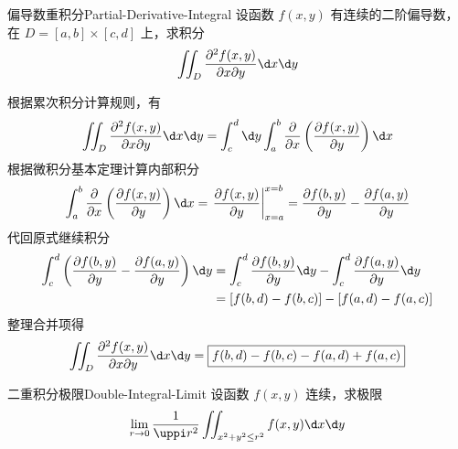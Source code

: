 \begin{problem}{偏导数重积分}{Partial-Derivative-Integral}
    设函数 $f(x, y)$ 有连续的二阶偏导数，在 $D = [a, b] \times [c, d]$ 上，求积分
    \begin{equation}
        \iint_D \frac{\partial^2 f(x, y)}{\partial x \partial y} \d x \d y
    \end{equation}
\end{problem}

\begin{solution}
    根据累次积分计算规则，有
    \begin{equation}
        \iint_D \frac{\partial^2 f(x, y)}{\partial x \partial y} \d x \d y = \int_c^d \d y \int_a^b \frac{\partial}{\partial x} \left( \frac{\partial f(x, y)}{\partial y} \right) \d x
    \end{equation}
    根据微积分基本定理计算内部积分
    \begin{equation}
        \int_a^b \frac{\partial}{\partial x} \left( \frac{\partial f(x, y)}{\partial y} \right) \d x = \left. \frac{\partial f(x, y)}{\partial y} \right|_{x=a}^{x=b} = \frac{\partial f(b, y)}{\partial y} - \frac{\partial f(a, y)}{\partial y}
    \end{equation}
    代回原式继续积分
    \begin{equation}
        \begin{aligned}
            \int_c^d \left( \frac{\partial f(b, y)}{\partial y} - \frac{\partial f(a, y)}{\partial y} \right) \d y & = \int_c^d \frac{\partial f(b, y)}{\partial y} \d y - \int_c^d \frac{\partial f(a, y)}{\partial y} \d y \\
                                                                                                                   & = [f(b, d) - f(b, c)] - [f(a, d) - f(a, c)]
        \end{aligned}
    \end{equation}
    整理合并项得
    \begin{equation}
        \iint_D \frac{\partial^2 f(x, y)}{\partial x \partial y} \d x \d y = \boxed{f(b, d) - f(b, c) - f(a, d) + f(a, c)}
    \end{equation}
\end{solution}


\begin{problem}{二重积分极限}{Double-Integral-Limit}
    设函数 $f(x, y)$ 连续，求极限
    \begin{equation}
        \lim_{r \to 0} \frac{1}{\uppi r^2} \iint_{x^2 + y^2 \le r^2} f(x, y) \d x \d y
    \end{equation}
\end{problem}

